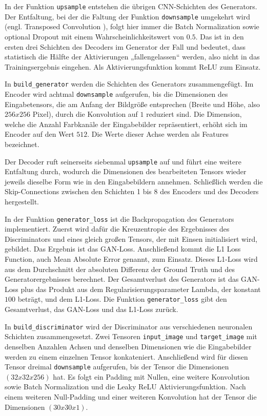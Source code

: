 In der Funktion \lstinline|upsample| entstehen die übrigen CNN-Schichten des Generators. Der Entfaltung, bei der die Faltung der Funktion \lstinline|downsample| umgekehrt wird (engl. Transposed Convolution \cite{zaccone2018tensorflow}), folgt hier immer die Batch Normalization sowie optional Dropout mit einem Wahrscheinlichkeitswert von $0.5$. Das ist in den ersten drei Schichten des Decoders im Generator der Fall und bedeutet, dass statistisch die Hälfte der Aktivierungen „fallengelassen“ werden, also nicht in das Trainingsergebnis eingehen. Als Aktivierungsfunktion kommt ReLU zum Einsatz.

In \lstinline|build_generator| werden die Schichten des Generators zusammengefügt. Im Encoder wird achtmal \lstinline|downsample| aufgerufen, bis die Dimensionen des Eingabetensors, die am Anfang der Bildgröße entsprechen (Breite und Höhe, also $256x256$ Pixel), durch die Konvolution auf $1$ reduziert sind. Die Dimension, welche die Anzahl Farbkanäle der Eingabebilder repräsentiert, erhöht sich im Encoder auf den Wert $512$. Die Werte dieser Achse werden als Features \cite{zhang2020dive} \cite{chollet2021deep} \cite{zaccone2018tensorflow} bezeichnet.

Der Decoder ruft seinerseits siebenmal \lstinline|upsample| auf und führt eine weitere Entfaltung durch, wodurch die Dimensionen des bearbeiteten Tensors wieder jeweils dieselbe Form wie in den Eingabebildern annehmen. Schließlich werden die Skip-Connections zwischen den Schichten 1 bis 8 des Encoders und des Decoders hergestellt.

In der Funktion \lstinline|generator_loss| ist die Backpropagation des Generators implementiert. Zuerst wird dafür die Kreuzentropie des Ergebnisses des Discriminators und eines gleich großen Tensors, der mit Einsen initialisiert wird, gebildet. Das Ergebnis ist das GAN-Loss. Anschließend kommt die L1 Loss Function, auch Mean Absolute Error genannt, zum Einsatz. Dieses L1-Loss wird aus dem Durchschnitt der absoluten Differenz der Ground Truth und des Generatorergebnisses berechnet. Der Gesamtverlust des Generators ist das GAN-Loss plus das Produkt aus dem Regularisierungsparameter Lambda, der konstant $100$ beträgt, und dem L1-Loss. Die Funktion \lstinline|generator_loss| gibt den Gesamtverlust, das GAN-Loss und das L1-Loss zurück.

In \lstinline|build_discriminator| wird der Discriminator aus verschiedenen neuronalen Schichten zusammengesetzt. Zwei Tensoren \lstinline|input_image| und \lstinline|target_image| mit denselben Anzahlen Achsen und denselben Dimensionen wie die Eingabebilder werden zu einem einzelnen Tensor konkateniert. Anschließend wird für diesen Tensor dreimal \lstinline|downsample| aufgerufen, bis der Tensor die Dimensionen $(32x32x256)$ hat. Es folgt ein Padding mit Nullen, eine weitere Konvolution sowie Batch Normalization und die Leaky ReLU Aktivierungsfunktion. Nach einem weiteren Null-Padding und einer weiteren Konvolution hat der Tensor die Dimensionen $(30x30x1)$.

